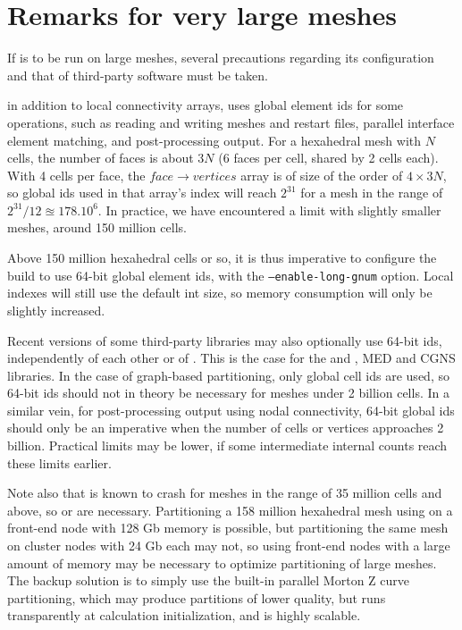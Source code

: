 \documentclass[a4paper,10pt,twoside]{article}
\begin{document}
\section{Remarks for very large meshes\label{sec:config:largemesh}}

If \CS is to be run on large meshes, several precautions regarding
its configuration and that of third-party software must be taken.

in addition to local connectivity arrays, \CS uses global element ids
for some operations, such as reading and writing meshes and restart files,
parallel interface element matching, and post-processing output.
For a hexahedral mesh with $N$ cells,
the number of faces is about $3N$ (6 faces per cell, shared by 2 cells each).
With 4 cells per face, the $face \rightarrow vertices$ array is of size
of the order of $4\times3N$, so global ids used in that array's index
will reach $2^{31}$ for a mesh in the range of $2^{31} / 12 \approxeq 178.10^6$.
In practice, we have encountered a limit with slightly smaller meshes,
around 150 million cells.

Above 150 million hexahedral cells or so, it is thus imperative to configure
the build to use 64-bit global element ids, with the
{\tt --enable-long-gnum} option. Local indexes will still use
the default {int} size, so memory consumption will only be slightly
increased.

Recent versions of some third-party libraries may also optionally use 64-bit ids,
independently of each other or of \CS.
This is the case for the \scotch and \metis, MED and
CGNS libraries. In the case of graph-based partitioning, only
global cell ids are used, so 64-bit ids should not in theory be necessary
for meshes under 2 billion cells. In a similar vein, for post-processing output
using nodal connectivity, 64-bit global ids should only be an imperative
when the number of cells or vertices approaches 2 billion.
Practical limits may be lower, if some intermediate internal counts
reach these limits earlier.

Note also that  is known to crash for meshes in the range of
35 million cells and above, so  or \scotch are necessary.
Partitioning a 158 million hexahedral mesh using 
on a front-end node with 128 Gb memory is possible,
but partitioning the same mesh on cluster nodes with 24 Gb each
may not, so using front-end nodes with a large amount of memory may be
necessary to optimize partitioning of large meshes.
The backup solution is to simply use the built-in parallel Morton Z curve
partitioning, which may produce partitions of lower quality, but
runs transparently at \CS calculation initialization, and is highly
scalable.
\end{document}
